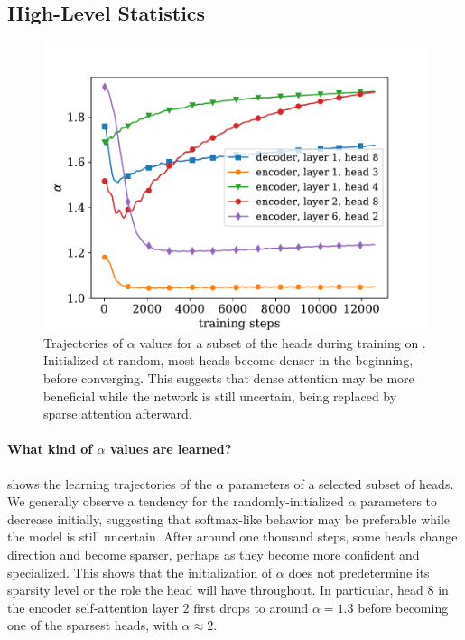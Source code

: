 \subsection{High-Level Statistics}
\label{sec:stats}

\begin{figure}[ht]
    \centering
    \includegraphics[width=0.95\columnwidth]{Figures/learning_alpha.pdf}
    \caption[Trajectories of $\alpha$ values for a subset of the heads during
        training.]{\label{fig:learning_alpha}
        Trajectories of $\alpha$ values for a subset of the heads during
        training on . Initialized at random, most heads become denser in the
        beginning, before converging. This suggests that dense attention may
        be more beneficial while the network is still uncertain, being
        replaced by sparse attention afterward.}
\end{figure}

\paragraph*{What kind of {\boldmath $\alpha$} values are learned?}
 shows the learning trajectories of the
$\alpha$ parameters of a selected subset of heads. We generally
observe a tendency for the randomly-initialized $\alpha$ parameters
to decrease initially, suggesting that softmax-like behavior may be
preferable while the model is still uncertain. After around one
thousand steps, some heads change direction and become sparser,
perhaps as they become more confident and specialized. This shows
that the initialization of $\alpha$ does not predetermine its
sparsity level or the role the head will have throughout. In
particular, head $8$ in the encoder self-attention layer $2$ first
drops to around $\alpha=1.3$ before becoming one of the sparsest
heads, with $\alpha\approx2$.

